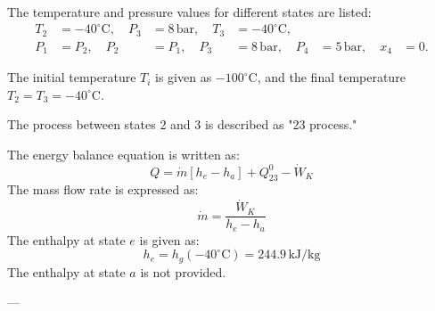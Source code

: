 The temperature and pressure values for different states are listed:  
\[
\begin{aligned}
T_2 &= -40^\circ\text{C}, \quad P_3 &= 8 \, \text{bar}, \quad T_3 &= -40^\circ\text{C}, \\
P_1 &= P_2, \quad P_2 &= P_1, \quad P_3 &= 8 \, \text{bar}, \quad P_4 &= 5 \, \text{bar}, \quad x_4 &= 0.
\end{aligned}
\]

The initial temperature \( T_i \) is given as \( -100^\circ\text{C} \), and the final temperature \( T_2 = T_3 = -40^\circ\text{C} \).  

The process between states 2 and 3 is described as "23 process."

The energy balance equation is written as:  
\[
Q = \dot{m} \left[ h_e - h_a \right] + Q_{23}^0 - \dot{W}_K
\]  
The mass flow rate is expressed as:  
\[
\dot{m} = \frac{\dot{W}_K}{h_e - h_a}
\]  
The enthalpy at state \( e \) is given as:  
\[
h_e = h_g(-40^\circ\text{C}) = 244.9 \, \text{kJ/kg}
\]  
The enthalpy at state \( a \) is not provided.

---